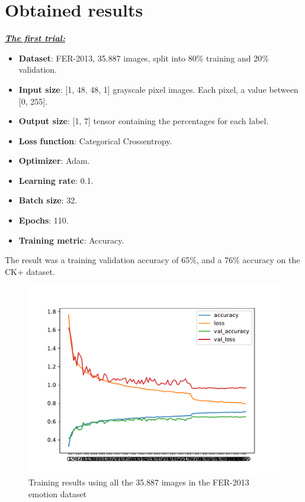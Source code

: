 \documentclass[runningheads,a4paper,11pt]{report}
\begin{document}
\section{Obtained results}
\label{section:or}
\underline{\textbf{\emph{The first trial:}}}
\begin{itemize}
	\item \textbf{Dataset}: FER-2013, 35.887 images, split into 80\% training and 20\% validation.
	\item \textbf{Input size}: [1, 48, 48, 1] grayscale pixel images. Each pixel, a value between [0, 255].
	\item \textbf{Output size}: [1, 7] tensor containing the percentages for each label.
	\item \textbf{Loss function}: Categorical Crossentropy.
	\item \textbf{Optimizer}: Adam.
	\item \textbf{Learning rate}: 0.1.
	\item \textbf{Batch size}: 32.
	\item \textbf{Epochs}: 110.
	\item \textbf{Training metric}: Accuracy.
\end{itemize}
The result was a training validation accuracy of 65\%, and a 76\% accuracy on the CK+ dataset.
\begin{figure}[htbp]
\begin{center}
	\includegraphics[scale=0.8]{Fig/fer_training_35k.pdf}
	\caption{Training results using all the 35.887 images in the FER-2013 emotion dataset}
	\label{fer_training_35k}
\end{center}
\end{figure}
\end{document}

